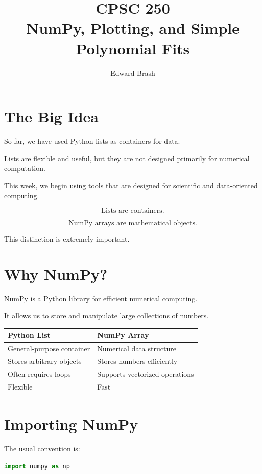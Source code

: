 \documentclass[11pt]{article}
\title{CPSC 250 \\ NumPy, Plotting, and Simple Polynomial Fits}
\author{Edward Brash}
\date{}
\begin{document}
\maketitle

\section{The Big Idea}

So far, we have used Python lists as containers for data.

Lists are flexible and useful, but they are not designed primarily for numerical computation.

This week, we begin using tools that are designed for scientific and data-oriented computing.

\[
\text{Lists are containers.}
\]

\[
\text{NumPy arrays are mathematical objects.}
\]

This distinction is extremely important.

\section{Why NumPy?}

NumPy is a Python library for efficient numerical computing.

It allows us to store and manipulate large collections of numbers.

\begin{center}
\begin{tabular}{ll}
\toprule
Python List & NumPy Array \\
\midrule
General-purpose container & Numerical data structure \\
Stores arbitrary objects & Stores numbers efficiently \\
Often requires loops & Supports vectorized operations \\
Flexible & Fast \\
\bottomrule
\end{tabular}
\end{center}

\section{Importing NumPy}

The usual convention is:

\begin{lstlisting}[language=Python]
import numpy as np
\end{lstlisting}
\end{document}
